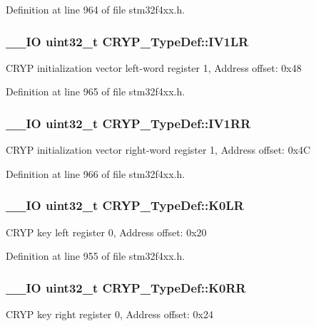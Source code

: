 Definition at line 964 of file stm32f4xx.\-h.

\hypertarget{struct_c_r_y_p___type_def_a8d837d2677d8ca1d8ed8bc018d6bb176}{
\subsubsection[{I\-V1\-L\-R}]{\setlength{\rightskip}{0pt plus 5cm}\-\_\-\-\_\-\-I\-O {\bf uint32\-\_\-t} C\-R\-Y\-P\-\_\-\-Type\-Def\-::\-I\-V1\-L\-R}}\label{struct_c_r_y_p___type_def_a8d837d2677d8ca1d8ed8bc018d6bb176}
C\-R\-Y\-P initialization vector left-\/word register 1, Address offset\-: 0x48 

Definition at line 965 of file stm32f4xx.\-h.

\hypertarget{struct_c_r_y_p___type_def_aca99392151eb711971f5260ca675c81b}{
\subsubsection[{I\-V1\-R\-R}]{\setlength{\rightskip}{0pt plus 5cm}\-\_\-\-\_\-\-I\-O {\bf uint32\-\_\-t} C\-R\-Y\-P\-\_\-\-Type\-Def\-::\-I\-V1\-R\-R}}\label{struct_c_r_y_p___type_def_aca99392151eb711971f5260ca675c81b}
C\-R\-Y\-P initialization vector right-\/word register 1, Address offset\-: 0x4\-C 

Definition at line 966 of file stm32f4xx.\-h.

\hypertarget{struct_c_r_y_p___type_def_a9dc2c37bda5dd59196c295be21c1f88b}{
\subsubsection[{K0\-L\-R}]{\setlength{\rightskip}{0pt plus 5cm}\-\_\-\-\_\-\-I\-O {\bf uint32\-\_\-t} C\-R\-Y\-P\-\_\-\-Type\-Def\-::\-K0\-L\-R}}\label{struct_c_r_y_p___type_def_a9dc2c37bda5dd59196c295be21c1f88b}
C\-R\-Y\-P key left register 0, Address offset\-: 0x20 

Definition at line 955 of file stm32f4xx.\-h.

\hypertarget{struct_c_r_y_p___type_def_a2a1fdc979620667cc9c40c5caa5cd6ba}{
\subsubsection[{K0\-R\-R}]{\setlength{\rightskip}{0pt plus 5cm}\-\_\-\-\_\-\-I\-O {\bf uint32\-\_\-t} C\-R\-Y\-P\-\_\-\-Type\-Def\-::\-K0\-R\-R}}\label{struct_c_r_y_p___type_def_a2a1fdc979620667cc9c40c5caa5cd6ba}
C\-R\-Y\-P key right register 0, Address offset\-: 0x24 

